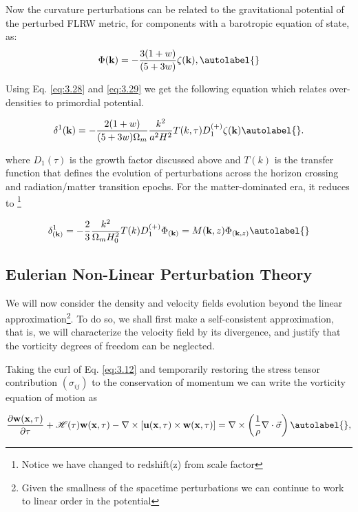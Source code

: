 Now the curvature perturbations can be related to the gravitational potential of the perturbed FLRW metric, for components with a barotropic equation of state, as:
\begin{align}
    \Phi(\mathbf{k})=-\frac{3(1+w)}{(5+3 w)}\zeta(\mathbf{k}) ,\autolabel{}
\end{align}

Using Eq. \eqref{eq:3.28} and \eqref{eq:3.29} we get the following equation which relates over-densities to primordial potential.

\begin{align}
    \delta^{1}(\mathbf{k})=-\frac{2(1+w)}{(5+3 w)\Omega_m} \frac{k^{2}}{a^{2} H^{2}} T(k, \tau)D_{1}^{(+)}\zeta(\mathbf{k}) \autolabel{}.
\end{align}

where $D_{1}(\tau)$ is the growth factor discussed above and $T(k)$ is the transfer function that defines the evolution of perturbations across the horizon crossing and radiation/matter transition epochs. For the matter-dominated era, it reduces to \footnote{Notice we have changed to redshift(z) from scale factor}

\begin{align}
    \delta^{1}_{(\mathbf{k})} = -\frac{2}{3} \frac{k^{2}}{\Omega_{m}H_{0}^{2}} T(k) D_{1}^{(+)} \Phi_{(\mathbf{k})} = M(\mathbf{k},z) \Phi_{(\mathbf{k},z)} \autolabel{}
\end{align}





\subsection{Eulerian Non-Linear Perturbation Theory}
We will now consider the density and velocity fields evolution beyond the linear approximation\footnote{Given the smallness of the spacetime perturbations we can continue to work to linear order in the potential }. To do so, we shall first make a self-consistent approximation, that is, we will characterize the velocity field by its divergence, and justify that the vorticity degrees of freedom can be neglected.

Taking the curl of Eq. \eqref{eq:3.12} and temporarily restoring the stress tensor contribution $\left(\sigma_{i j}\right)$ to the conservation of momentum we can write the vorticity equation of motion as


\begin{equation}
    \frac{\partial \mathbf{w}(\mathbf{x}, \tau)}{\partial \tau}+\mathcal{H}(\tau) \mathbf{w}(\mathbf{x}, \tau)-\nabla \times[\mathbf{u}(\mathbf{x}, \tau) \times \mathbf{w}(\mathbf{x}, \tau)]=\nabla \times\left(\frac{1}{\rho} \nabla \cdot \vec{\sigma}\right) \autolabel{},
\end{equation}

